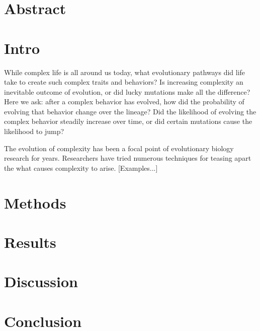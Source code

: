 \section{Abstract}

\section{Intro}

While complex life is all around us today, what evolutionary pathways did life take to create such complex traits and behaviors?
Is increasing complexity an inevitable outcome of evolution, or did lucky mutations make all the difference?
Here we ask: after a complex behavior has evolved, how did the probability of evolving that behavior change over the lineage?
Did the likelihood of evolving the complex behavior steadily increase over time, or did certain mutations cause the likelihood to jump?

The evolution of complexity has been a focal point of evolutionary biology research for years. 
Researchers have tried numerous techniques for teasing apart the what causes complexity to arise. 
[Examples...]

\section{Methods}

\section{Results}

\section{Discussion}

\section{Conclusion}